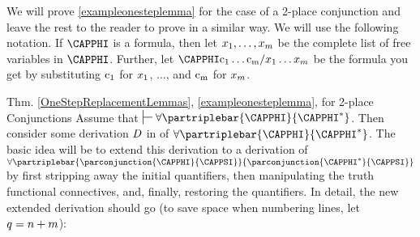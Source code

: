 \noindent{}We will prove \ref{exampleonesteplemma} for the case of a 2-place conjunction and leave the rest to the reader to prove in a similar way.
We will use the following notation. 
If $\CAPPHI$ is a \GQL{} formula, then let $x_1,\ldots,x_{m}$ be the complete list of free variables in $\CAPPHI$. 
Further, let $\CAPPHI\constant{c_{\integer{1}}}\ldots\constant{c_{\integer{\integer{m}}}}/\variable{x}_1\ldots\variable{x}_{\integer{m}}$ be the formula you get by substituting $\mathrm{c_1}$ for $x_1$, $\ldots$, and $\mathrm{c_{m}}$ for $x_{m}$.
\begin{PROOFOF}{Thm. \ref{OneStepReplacementLemmas}, \ref{exampleonesteplemma}, for 2-place Conjunctions}
Assume that $\sststile{}{}\forall\partriplebar{\CAPPHI}{\CAPPHI^*}$. 
Then consider some derivation $\mathit{D}$ in \GQD{} of $\forall\partriplebar{\CAPPHI}{\CAPPHI^*}$.
The basic idea will be to extend this derivation to a derivation of $\forall\partriplebar{\parconjunction{\CAPPHI}{\CAPPSI}}{\parconjunction{\CAPPHI^*}{\CAPPSI}}$ by first stripping away the initial quantifiers, then manipulating the truth functional connectives, and, finally, restoring the quantifiers. In detail, the new extended derivation should go (to save space when numbering lines, let $q=n+m$):
\begin{gproofnn}
\glinend{ }{$\qquad\vdots$}{ }
\glinend{ }{$\qquad\vdots$}{ }
\end{gproofnn}
\end{PROOFOF}
